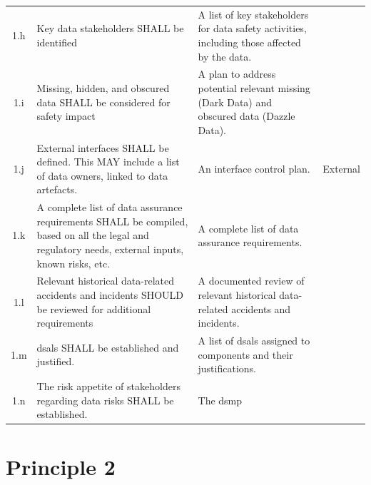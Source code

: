 \begin{longtable}{|C{}|L{}|L{}|L{}|}
	  \\\hline
	1.h & %
	  Key data stakeholders SHALL be identified &%
	  A list of key stakeholders for data safety activities, including those affected by the data. & %
	  \\\hline
	1.i & %
	  Missing, hidden, and obscured data SHALL be considered for safety impact &%
	  A plan to address potential relevant missing (Dark Data) and obscured data (Dazzle Data).&%
	  \\\hline
	1.j & %
	  External interfaces SHALL be defined. This MAY include a list of data owners, linked to data artefacts.&%
	  An interface control plan. &%
	  External
	  \\\hline
	1.k & %
	  A complete list of data assurance requirements SHALL be compiled, based on all the legal and regulatory needs, external inputs, known risks, etc. & %
	  A complete list of data assurance requirements. &
	  \\\hline
	1.l & %
	  Relevant historical data-related accidents and incidents SHOULD be reviewed for additional requirements &%
	  A documented review of relevant historical data-related accidents and incidents. &%
	  \\\hline
	1.m & %
	  \glspl{dsal} SHALL be established and justified.&%
	  A list of \glspl{dsal} assigned to components and their justifications.&%
	  \\\hline
	1.n &%
	The risk appetite of stakeholders regarding data risks SHALL be established.&%
	The \gls{dsmp}&
	\\\hline
	 \end{longtable}
\cbend

\section{Principle 2}

